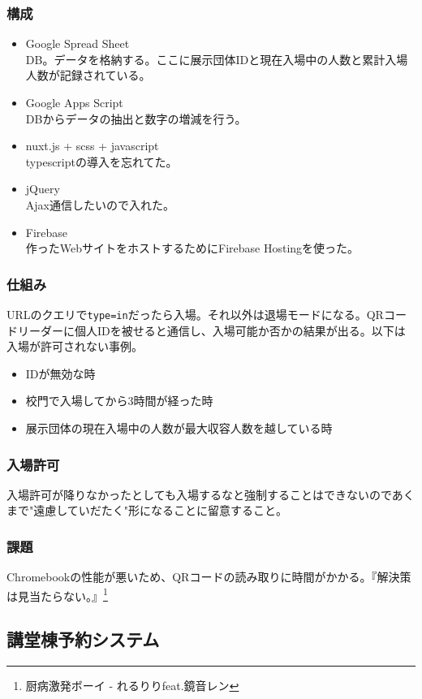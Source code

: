 \documentclass[dvipdfmx,jb5]{jarticle}
\begin{document}
\subsubsection{構成}
\begin{itemize}
  \item Google Spread Sheet\\
  DB。データを格納する。ここに展示団体IDと現在入場中の人数と累計入場人数が記録されている。
   \item Google Apps Script\\
   DBからデータの抽出と数字の増減を行う。
   \item nuxt.js + scss + javascript\\
   typescriptの導入を忘れてた。
   \item jQuery\\
   Ajax通信したいので入れた。
   \item Firebase\\
   作ったWebサイトをホストするためにFirebase Hostingを使った。
  \end{itemize}

\subsubsection{仕組み}
URLのクエリで\verb|type=in|だったら入場。それ以外は退場モードになる。QRコードリーダーに個人IDを被せると通信し、入場可能か否かの結果が出る。以下は入場が許可されない事例。
\begin{itemize}
\item IDが無効な時
\item 校門で入場してから3時間が経った時
\item 展示団体の現在入場中の人数が最大収容人数を越している時
\end{itemize}

\subsubsection{入場許可}
入場許可が降りなかったとしても入場するなと強制することはできないのであくまで"遠慮していだたく"形になることに留意すること。

\subsubsection{課題}
Chromebookの性能が悪いため、QRコードの読み取りに時間がかかる。『解決策は見当たらない。』\footnote{厨病激発ボーイ - れるりりfeat.鏡音レン}

\subsection{講堂棟予約システム}
\end{document}
